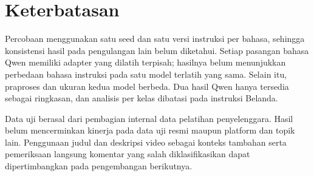 \documentclass[11pt]{article}
\begin{document}
\section*{Keterbatasan}
Percobaan menggunakan satu seed dan satu versi instruksi per bahasa, sehingga konsistensi hasil pada pengulangan lain belum diketahui. Setiap pasangan bahasa Qwen memiliki adapter yang dilatih terpisah; hasilnya belum menunjukkan perbedaan bahasa instruksi pada satu model terlatih yang sama. Selain itu, praproses dan ukuran kedua model berbeda. Dua hasil Qwen hanya tersedia sebagai ringkasan, dan analisis per kelas dibatasi pada instruksi Belanda.

Data uji berasal dari pembagian internal data pelatihan penyelenggara. Hasil belum mencerminkan kinerja pada data uji resmi maupun platform dan topik lain. Penggunaan judul dan deskripsi video sebagai konteks tambahan serta pemeriksaan langsung komentar yang salah diklasifikasikan dapat dipertimbangkan pada pengembangan berikutnya.


\end{document}
